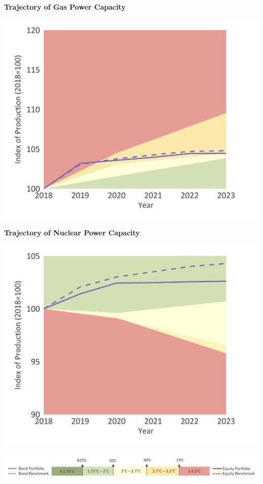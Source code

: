 \documentclass[10pt,table,a4]{article}\usepackage[]{graphicx}\usepackage[]{color}
\begin{document}
		\begin{minipage}[t]{.49\textwidth}
			\textbf{Trajectory of Gas Power Capacity }
			
			\includegraphics[trim = {0 0cm 0 0},width=1\linewidth]{Figures/Fig16}
		
			\textbf{Trajectory of Nuclear Power Capacity }
			
			\includegraphics[trim = {0 0cm 0 0},width=1\linewidth]{Figures/Fig17}
	
		\end{minipage}
	
		\vspace{-0.4cm}
		\begin{center}
			\includegraphics[trim = {0 0cm 0 0},width=.8\linewidth]{ReportGraphics/246Legend.png}
		\end{center}
		
\end{document}
